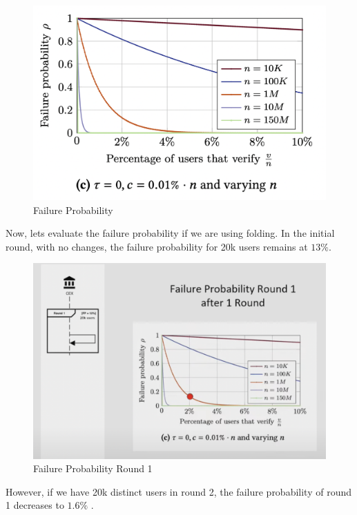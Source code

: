 \begin{figure}[H]
   \centering
   \includegraphics[width=130mm]{FailureProbability.png}
   \caption{Failure Probability \cite{GP21}}
   \label{overflow}
   \end{figure}

Now, lets evaluate the failure probability if we are using folding.
In the initial round, with no changes, the failure probability for 20k users remains at $13\%$.

\begin{figure}[H]
   \centering
   \includegraphics[width=130mm]{FailureProbabilityRound1.png}
   \caption{Failure Probability Round 1 \cite{NS23}}
   \label{overflow}
   \end{figure}

However, if we have 20k distinct users in round 2, the failure probability of round 1 decreases to $1.6\%$ .

